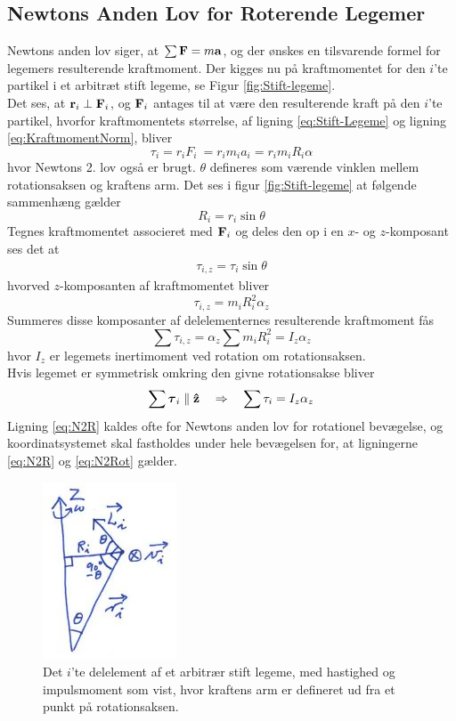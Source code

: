 \subsection{Newtons Anden Lov for Roterende Legemer}
Newtons anden lov siger, at $\sum\mathbf{F}=m\mathbf{a}$, og der ønskes en tilsvarende formel for legemers resulterende kraftmoment. Der kigges nu på kraftmomentet for den $i$'te partikel i et arbitræt stift legeme, se Figur \ref{fig:Stift-legeme}. \\
Det ses, at $\mathbf{r}_i\perp\mathbf{F}_i$, og $\mathbf{F}_i$ antages til at være den resulterende kraft på den $i$'te partikel, hvorfor kraftmomentets størrelse, af ligning \ref{eq:Stift-Legeme} og ligning \ref{eq:KraftmomentNorm}, bliver
\begin{equation}
    \tau_i = r_iF_i\ = r_im_ia_i = r_im_iR_i\alpha
\end{equation}
hvor Newtons 2. lov også er brugt. $\theta$ defineres som værende vinklen mellem rotationsaksen og kraftens arm. Det ses i figur \ref{fig:Stift-legeme} at følgende sammenhæng gælder
\begin{equation}
    R_i=r_i\sin\theta
\end{equation}
Tegnes kraftmomentet associeret med $\mathbf{F}_i$ og deles den op i en $x$- og $z$-komposant ses det at
\begin{align}
\tau_{i,z} = \tau_i\sin\theta
\end{align}
hvorved $z$-komposanten af kraftmomentet bliver
\begin{equation}
    \tau_{i,z}=m_iR_i^2\alpha_z
\end{equation}
Summeres disse komposanter af delelementernes resulterende kraftmoment fås
\begin{equation} \label{eq:N2R}
    \sum\tau_{i,z}=\alpha_z\sum m_iR_i^2=I_z\alpha_z
\end{equation}
hvor $I_z$ er legemets inertimoment ved rotation om rotationsaksen. \\
Hvis legemet er symmetrisk omkring den givne rotationsakse bliver
\begin{equation} \label{eq:N2Rot}
    \sum\mbox{\boldmath$ \tau $}_{i}\parallel \mathbf{\hat{z}} \quad\Rightarrow\quad \sum\tau_{i}=I_z\alpha_z
\end{equation}
Ligning \ref{eq:N2R} kaldes ofte for Newtons anden lov for rotationel bevægelse, og koordinatsystemet skal fastholdes under hele bevægelsen for, at ligningerne \ref{eq:N2R} og \ref{eq:N2Rot} gælder.

\begin{figure}[h!]
\centering
\includegraphics[width=.25\textwidth]{RotationelMekanik/Impulsmoment}
\caption{ Det $i$'te delelement af et arbitrær stift legeme, med hastighed og impulsmoment som vist, hvor kraftens arm er defineret ud fra et punkt på rotationsaksen.}
\label{fig:Impulsmoment}
\end{figure}

